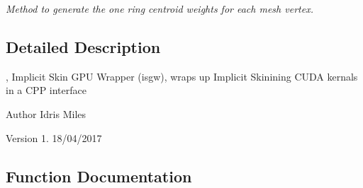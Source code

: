 \begin{DoxyCompactItemize}
\begin{DoxyCompactList}\small\item\em Method to generate the one ring centroid weights for each mesh vertex. \end{DoxyCompactList}\end{DoxyCompactItemize}


\subsection{Detailed Description}
, Implicit Skin G\+PU Wrapper (isgw), wraps up Implicit Skinining C\+U\+DA kernals in a C\+PP interface 

\begin{DoxyAuthor}{Author}
Idris Miles 
\end{DoxyAuthor}
\begin{DoxyVersion}{Version}
1.  18/04/2017 
\end{DoxyVersion}


\subsection{Function Documentation}
